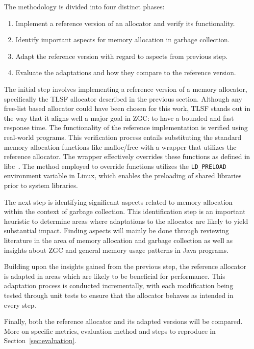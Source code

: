 
The methodology is divided into four distinct phases:

\begin{enumerate}
    \item Implement a reference version of an allocator and verify its functionality.
    \item Identify important aspects for memory allocation in garbage collection.
    \item Adapt the reference version with regard to aspects from previous step.
    \item Evaluate the adaptations and how they compare to the reference version.
\end{enumerate}

The initial step involves implementing a reference version of a memory allocator, specifically the TLSF allocator described in the previous section. Although any free-list based allocator could have been chosen for this work, TLSF stands out in the way that it aligns well a major goal in ZGC: to have a bounded and fast response time. The functionality of the reference implementation is verified using real-world programs. This verification process entails substituting the standard memory allocation functions like malloc/free with a wrapper that utilizes the reference allocator. The wrapper effectively overrides these functions as defined in libc~\cite{mallocman}. The method employed to override functions utilizes the \texttt{LD\_PRELOAD} environment variable in Linux, which enables the preloading of shared libraries prior to system libraries.

The next step is identifying significant aspects related to memory allocation within the context of garbage collection. This identification step is an important heuristic to determine areas where adaptations to the allocator are likely to yield substantial impact. Finding aspects will mainly be done through reviewing literature in the area of memory allocation and garbage collection as well as insights about ZGC and general memory usage patterns in Java programs.

Building upon the insights gained from the previous step, the reference allocator is adapted in areas which are likely to be beneficial for performance. This adaptation process is conducted incrementally, with each modification being tested through unit tests to ensure that the allocator behaves as intended in every step.

Finally, both the reference allocator and its adapted versions will be compared. More on specific metrics, evaluation method and steps to reproduce in Section~\ref{sec:evaluation}.

